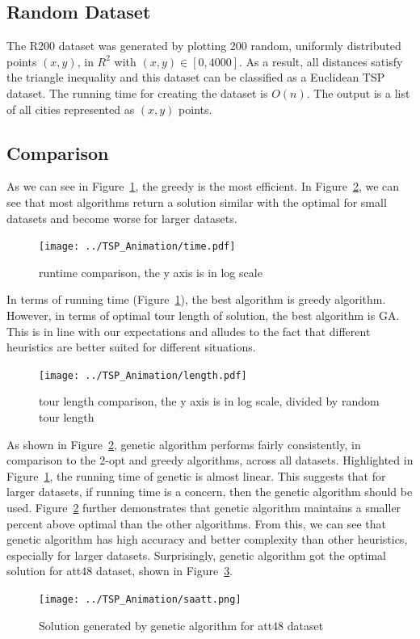 \documentclass[10pt,twocolumn,letterpaper]{article}
\begin{document}
\subsection{Random Dataset}
The R200 dataset was generated by plotting 200 random, 
uniformly distributed points $(x, y)$, in $R^2$ with $(x, y) \in
[0, 4000]$. As a result, all
distances satisfy the triangle inequality and this dataset can
be classified as a Euclidean TSP dataset. The running time
for creating the dataset is $O(n)$. 
The output is a list of all cities represented as $(x,y)$ points.

\subsection{Comparison}
As we can see in Figure~\ref{fig:tsp}, the greedy is the most efficient. In Figure~\ref{fig:length},
we can see that most algorithms return a solution similar with the optimal for small datasets and become worse for larger datasets.
\begin{figure}
\centering
\texttt{[image: ../TSP\_Animation/time.pdf]}
\caption{runtime comparison, the y axis is in log scale}
\label{fig:tsp}
\end{figure}

In terms of running time (Figure~\ref{fig:tsp}), the best algorithm is greedy algorithm. However, in terms of optimal tour length of solution, the best algorithm is GA. This is in line with our expectations and alludes to the fact that different heuristics
are better suited for different situations.
\begin{figure}
	\centering
	\texttt{[image: ../TSP\_Animation/length.pdf]}
	\caption{tour length comparison, the y axis is in log scale, divided by random tour length}
	\label{fig:length}
\end{figure}

As shown in Figure~\ref{fig:length}, genetic algorithm performs fairly consistently, in comparison to the 2-opt and greedy algorithms, across all datasets. Highlighted in
Figure~\ref{fig:tsp}, the running time of genetic is almost linear. This suggests that for larger
datasets, if running time is a concern, then the genetic
algorithm should be used. Figure~\ref{fig:length} further demonstrates
that genetic algorithm maintains a smaller percent above
optimal than the other algorithms. From this, we can see
that genetic algorithm has high accuracy and better complexity than other heuristics, especially for larger datasets. Surprisingly, genetic algorithm got the optimal solution for att48 dataset, shown in Figure~\ref{fig:saatt}.
\begin{figure}
\centering
\texttt{[image: ../TSP\_Animation/saatt.png]}
\caption{Solution generated by genetic algorithm for att48 dataset}
\label{fig:saatt}
\end{figure}
\end{document}
